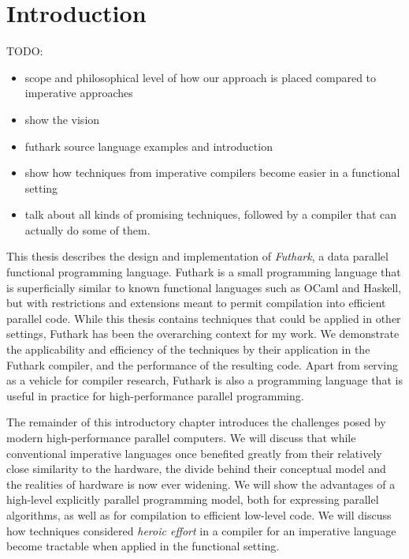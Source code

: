 \chapter{Introduction}

TODO:

\begin{itemize}
\item scope and philosophical level of how our approach is placed compared to imperative approaches

\item show the vision

\item futhark source language examples and introduction

\item show how techniques from imperative compilers become easier in a functional setting

\item talk about all kinds of promising techniques, followed by a compiler that can actually do some of them.
\end{itemize}

This thesis describes the design and implementation of
\textit{Futhark}, a data parallel functional programming language.
Futhark is a small programming language that is superficially similar
to known functional languages such as OCaml and Haskell, but with
restrictions and extensions meant to permit compilation into efficient
parallel code.  While this thesis contains techniques that could be
applied in other settings, Futhark has been the overarching context
for my work.  We demonstrate the applicability and efficiency of the
techniques by their application in the Futhark compiler, and the
performance of the resulting code.  Apart from serving as a vehicle
for compiler research, Futhark is also a programming language that is
useful in practice for high-performance parallel programming.

The remainder of this introductory chapter introduces the challenges
posed by modern high-performance parallel computers.  We will discuss
that while conventional imperative languages once benefited greatly
from their relatively close similarity to the hardware, the divide
behind their conceptual model and the realities of hardware is now
ever widening.  We will show the advantages of a high-level explicitly
parallel programming model, both for expressing parallel algorithms,
as well as for compilation to efficient low-level code.  We will
discuss how techniques considered \textit{heroic effort} in a compiler
for an imperative language become tractable when applied in the
functional setting.


